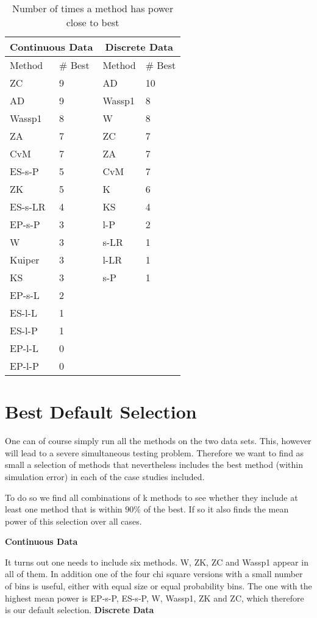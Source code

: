 \documentclass[]{svjour3}
\begin{document}
\begin{table}[H]
\centering\begingroup\fontsize{14}{17}\selectfont
\label{tab:table6}
\caption{Number of times a method has power close to best}
\begin{tabular}{ll||ll}
\hline
\multicolumn{2}{c}{Continuous Data} & \multicolumn{2}{c}{Discrete Data}\\
\hline
Method & \# Best & Method & \# Best\\
\hline
ZC & 9 & AD & 10\\
AD & 9 & Wassp1 & 8\\
Wassp1 & 8 & W & 8\\
ZA & 7 & ZC & 7\\
CvM & 7 & ZA & 7\\
ES-s-P & 5 & CvM & 7\\
ZK & 5 & K & 6\\
ES-s-LR & 4 & KS & 4\\
EP-s-P & 3 & l-P & 2\\
W & 3 & s-LR& 1\\
Kuiper & 3 & l-LR & 1\\
KS & 3 & s-P & 1\\
EP-s-L & 2 &  & \\
ES-l-L & 1 &  & \\
ES-l-P & 1 &  & \\
EP-l-L & 0 &  & \\
EP-l-P & 0 &  & \\
\hline
\end{tabular}
\endgroup{}
\end{table}

\section{Best Default Selection}

One can of course simply run all the methods on the two data sets. This,
however will lead to a severe simultaneous testing problem. Therefore we
want to find as small a selection of methods that nevertheless includes
the best method (within simulation error) in each of the case studies
included.

To do so we find all combinations of k methods to see whether they
include at least one method that is within \(90\%\) of the best. If so
it also finds the mean power of this selection over all cases.

\textbf{Continuous Data}

It turns out one needs to include six methods. W, ZK, ZC and Wassp1 appear
in all of them. In addition one of the four chi square versions with a
small number of bins is useful, either with equal size or equal
probability bins. The one with the highest mean power is EP-s-P, ES-s-P, W, Wassp1, ZK and ZC, which therefore is our
default selection.
\textbf{Discrete Data}
\end{document}
